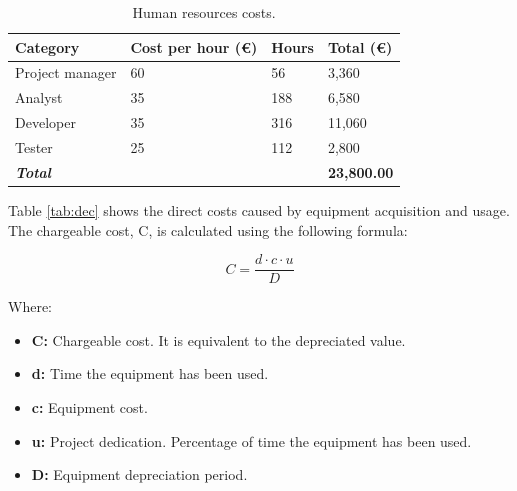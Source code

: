 \begin{center}
\begin{table}[htbp]
\centering
\begin{tabular}{@{}p{3cm} R{3.5cm} R{2.2cm} R{2.4cm}@{}} 
\toprule
\textbf{Category} & \textbf{Cost per hour (\euro)} & \textbf{Hours} & \textbf{Total (\euro)} \\
\midrule
Project manager					& 60 						& 56			& 3,360 \\
Analyst			 				& 35							& 188		& 6,580 \\
Developer		 				& 35							& 316		& 11,060 \\
Tester		 					& 25							& 112		& 2,800 \\
\midrule
\textbf{\textit{Total}}			&							&			& \textbf{23,800.00}\\
\bottomrule
\end{tabular}
\caption{Human resources costs.}
\label{tab:dhrc}
\end{table}
\end{center}

Table \ref{tab:dec} shows the direct costs caused by equipment acquisition and usage. The chargeable cost, C, is calculated using the following formula:

\begin{equation}
  C = \frac{d \cdot c \cdot u}{D}
\label{eq:costs}
\end{equation}

Where:

\begin{itemize}

\item \textbf{C:} Chargeable cost. It is equivalent to the depreciated value.

\item \textbf{d:} Time the equipment has been used.

\item \textbf{c:} Equipment cost. 

\item \textbf{u:} Project dedication. Percentage of time the equipment has been used.

\item \textbf{D:} Equipment depreciation period.

\end{itemize}

